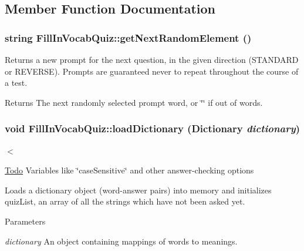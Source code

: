 \subsection{Member Function Documentation}
\hypertarget{classFillInVocabQuiz_a551b818f3b29e9c72e44cc9c0ba1c4cb}{
\subsubsection[{getNextRandomElement}]{\setlength{\rightskip}{0pt plus 5cm}string FillInVocabQuiz::getNextRandomElement ()}}
\label{classFillInVocabQuiz_a551b818f3b29e9c72e44cc9c0ba1c4cb}
Returns a new prompt for the next question, in the given direction (STANDARD or REVERSE). Prompts are guaranteed never to repeat throughout the course of a test. \begin{DoxyReturn}{Returns}
The next randomly selected prompt word, or \char`\"{}\char`\"{} if out of words. 
\end{DoxyReturn}
\hypertarget{classFillInVocabQuiz_affe1c2da58f58e96643a5d95bf3a6e47}{
\subsubsection[{loadDictionary}]{\setlength{\rightskip}{0pt plus 5cm}void FillInVocabQuiz::loadDictionary ({\bf Dictionary} {\em dictionary})}}
\label{classFillInVocabQuiz_affe1c2da58f58e96643a5d95bf3a6e47}


$<$ 

\begin{Desc}
\item[\hyperlink{todo__todo000003}{Todo}]Variables like \char`\"{}caseSensitive\char`\"{} and other answer-\/checking options \end{Desc}


Loads a dictionary object (word-\/answer pairs) into memory and initializes quizList, an array of all the strings which have not been asked yet. 
\begin{DoxyParams}{Parameters}
\item[{\em dictionary}]An object containing mappings of words to meanings. \end{DoxyParams}


